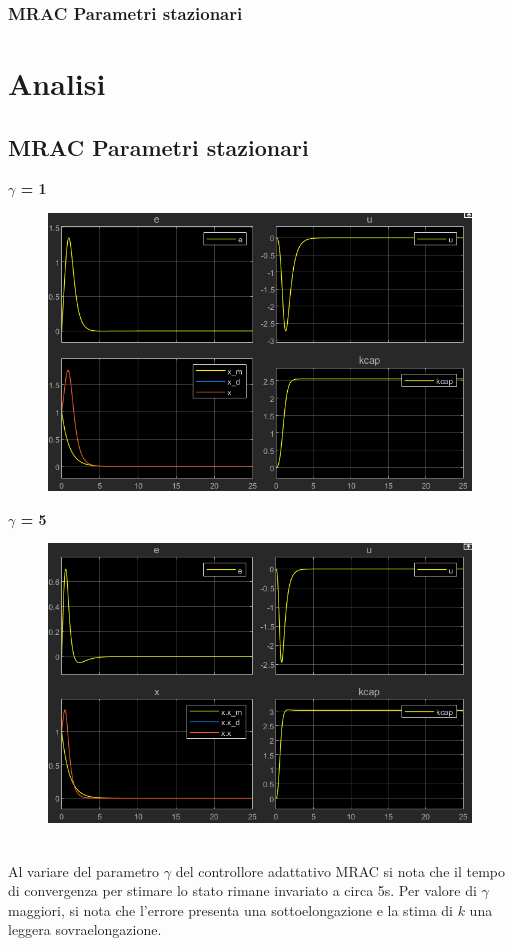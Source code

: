 \documentclass{beamer}
\begin{document}
\begin{frame}
	\frametitle{MRAC Parametri stazionari}
	\section{Analisi}
	\subsection{MRAC Parametri stazionari}
	\begin{minipage}[t]{0.45\textwidth}
		\textbf{\(\gamma\) = 1}
		\begin{figure}
			\includegraphics[scale=0.25]{2022-05-20-10-29-19.png} %
		\end{figure}
	\end{minipage}
	\begin{minipage}[t]{0.45\textwidth}
		\textbf{\(\gamma\) = 5}
		\begin{figure}
			\includegraphics[scale=0.25]{2022-05-20-10-33-35.png} %
		\end{figure}
	\end{minipage}
	\vspace{0.1cm}
	\\Al variare del parametro \(\gamma\) del controllore adattativo MRAC si nota che il tempo di convergenza per stimare lo stato rimane invariato a circa 5s. Per valore di \(\gamma\) maggiori, si nota che l'errore presenta una sottoelongazione e la stima di \(k\) una leggera sovraelongazione.
\end{frame}
\end{document}
